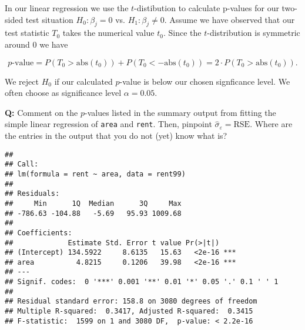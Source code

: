 \documentclass[ignorenonframetext,]{beamer}
\begin{document}
\begin{frame}

In our linear regression we use the \(t\)-distibution to calculate
p-values for our two-sided test situation \(H_0: \beta_j=0\) vs.
\(H_1: \beta_j \neq 0\). Assume we have observed that our test statistic
\(T_0\) takes the numerical value \(t_0\). Since the \(t\)-distribution
is symmetric around \(0\) we have

\[p\text{-value}=P(T_0>\text{abs}(t_0))+P(T_0<-\text{abs}(t_0))=2\cdot P(T_0>\text{abs}(t_0)).\]

We reject \(H_0\) if our calculated \(p\)-value is below our chosen
signficance level. We often choose as significance level
\(\alpha=0.05\).

\end{frame}

\begin{frame}[fragile]

\textbf{Q:} Comment on the \(p\)-values listed in the summary output
from fitting the simple linear regression of \texttt{area} and
\texttt{rent}. Then, pinpoint \(\hat{\sigma}_{\varepsilon}=\text{RSE}\).
Where are the entries in the output that you do not (yet) know what is?

\footnotesize

\begin{verbatim}
## 
## Call:
## lm(formula = rent ~ area, data = rent99)
## 
## Residuals:
##     Min      1Q  Median      3Q     Max 
## -786.63 -104.88   -5.69   95.93 1009.68 
## 
## Coefficients:
##             Estimate Std. Error t value Pr(>|t|)    
## (Intercept) 134.5922     8.6135   15.63   <2e-16 ***
## area          4.8215     0.1206   39.98   <2e-16 ***
## ---
## Signif. codes:  0 '***' 0.001 '**' 0.01 '*' 0.05 '.' 0.1 ' ' 1
## 
## Residual standard error: 158.8 on 3080 degrees of freedom
## Multiple R-squared:  0.3417, Adjusted R-squared:  0.3415 
## F-statistic:  1599 on 1 and 3080 DF,  p-value: < 2.2e-16
\end{verbatim}

\normalsize

\end{frame}
\end{document}
